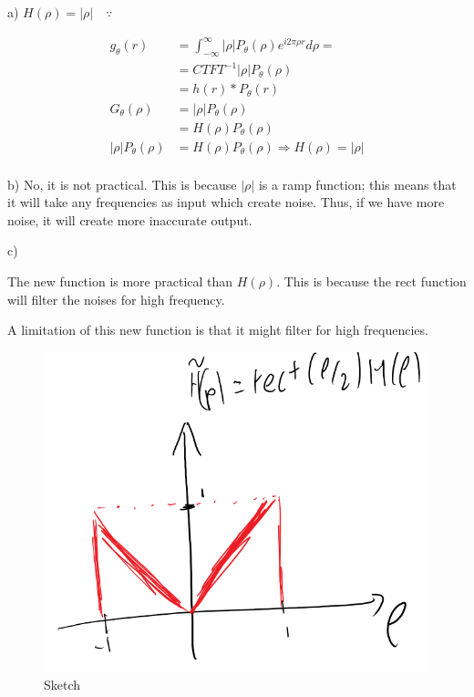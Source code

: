 \documentclass[11pt]{article}
\begin{document}
\begin{flushleft}
a) \newline
$H(\rho) = |\rho| \quad \because$ 
\end{flushleft}
\begin{equation*}
\begin{split}
    g_\theta (r) &= \int_{-\infty}^{\infty} |\rho| P_\theta (\rho)e^{i2\pi \rho r} d\rho = \\
                & = CTFT^{-1} {|\rho|P_\theta (\rho)} \\
                & = h(r) * P_\theta(r) \\
    G_\theta(\rho) & = |\rho|P_\theta(\rho) \\
    & = H(\rho)P_\theta(\rho) \\
    |\rho|P_\theta(\rho) & = H(\rho)P_\theta(\rho) \Rightarrow H(\rho) = |\rho|\\
\end{split}  
\end{equation*}
\begin{flushleft}
b) \newline
No, it is not practical. This is because $|\rho|$ is a ramp function; this means that it will take any frequencies as input which create noise.
Thus, if we have more noise, it will create more inaccurate output.
\end{flushleft}
\begin{flushleft}
c) \newline

The new function is more practical than $H(\rho)$. This is because the rect function will filter the noises for high frequency.
\newline

A limitation of this new function is that it might filter for high frequencies.

\begin{figure}[htbp]
    \centerline{\includegraphics[scale=.5]{Capture.PNG}}
    \caption{Sketch}
    \label{fig}
\end{figure}

\end{flushleft}
\end{document}
